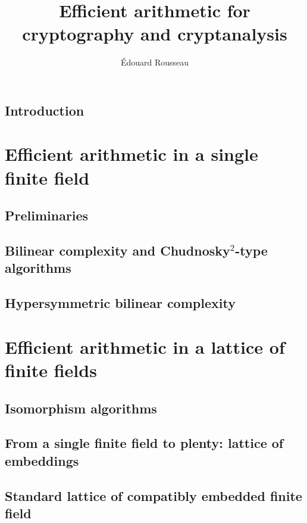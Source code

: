 \documentclass[a4paper,11pt]{report}
\title{Efficient arithmetic for cryptography and cryptanalysis}
\author{Édouard Rousseau}
\begin{document}
\maketitle



\dominitoc
\tableofcontents


%

\chapter{Introduction}


\part{Efficient arithmetic in a single finite field}
\label{part:single}

\chapter{Preliminaries}
\label{chap:preliminary}


\chapter{Bilinear complexity and Chudnosky$^2$-type algorithms}
\label{chap:bilinear}


\chapter{Hypersymmetric bilinear complexity}
\label{chap:hypersymmetric}


\part{Efficient arithmetic in a lattice of finite fields}
\label{part:lattice}

\chapter{Isomorphism algorithms}
\label{chap:isomorphism}


\chapter{From a single finite field to plenty: lattice of embeddings}
\label{chap:lattice}


\chapter{Standard lattice of compatibly embedded finite field}
\label{chap:standard}


\clearpage


\end{document}
